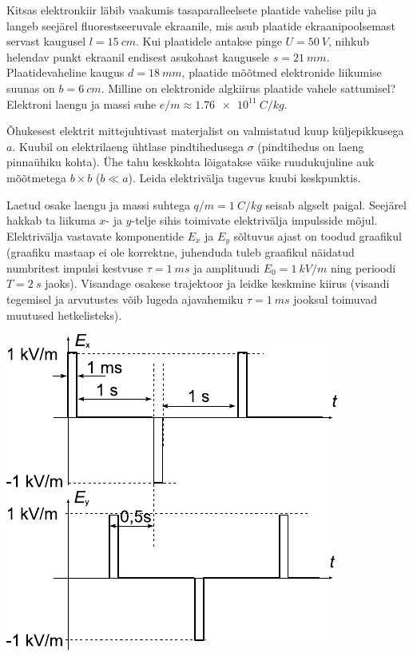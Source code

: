 \documentclass[10pt]{article}
\begin{document}
{%

Kitsas elektronkiir läbib vaakumis tasaparalleelsete plaatide vahelise pilu ja langeb seejärel fluorestseeruvale ekraanile, mis asub plaatide ekraanipoolsemast servast kaugusel $l = \SI{15}{cm}$. Kui plaatidele antakse pinge $U = \SI{50}{V}$, nihkub helendav punkt ekraanil endisest asukohast kaugusele $s = \SI{21}{mm}$. Plaatidevaheline kaugus $d = \SI{18}{mm}$, plaatide mõõtmed elektronide liikumise suunas on $b = \SI{6}{cm}$. Milline on elektronide algkiirus plaatide vahele sattumisel? Elektroni laengu ja massi suhe $e/m \approx \SI{1,76e11}{C/kg}$.
\probend
\bigskip


Õhukesest elektrit mittejuhtivast materjalist on valmistatud kuup küljepikkusega $a$. Kuubil on elektrilaeng ühtlase pindtihedusega $\sigma$ (pindtihedus on laeng pinnaühiku kohta). Ühe tahu keskkohta lõigatakse väike ruudukujuline auk mõõtmetega $b \times b$ ($b \ll a$). Leida elektrivälja tugevus kuubi keskpunktis.
\probend
\bigskip


Laetud osake laengu ja massi suhtega $q/m = \SI{1}{C/kg}$ seisab algselt paigal. Seejärel hakkab ta liikuma $x$- ja $y$-telje sihis
toimivate elektrivälja impulsside mõjul. Elektrivälja vastavate komponentide $E_x$ ja $E_y$ sõltuvus ajast on toodud graafikul (graafiku mastaap
ei ole korrektne, juhenduda tuleb graafikul näidatud numbritest impulsi
kestvuse $\tau = \SI{1}{ms}$ ja amplituudi $E_0 = \SI{1}{kV/m}$ ning perioodi $T = \SI{2}{s}$
jaoks). Visandage osakese trajektoor ja leidke keskmine kiirus (visandi tegemisel ja arvutustes võib lugeda ajavahemiku $\tau = \SI{1}{ms}$ jooksul
toimuvad muutused hetkelisteks). 

\begin{center}
	\includegraphics[width=0.6\linewidth]{2009-v2g-06-yl}
\end{center}
\probend
\bigskip

}
\end{document}
